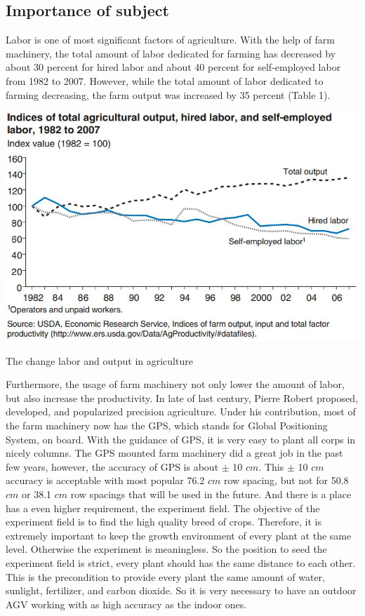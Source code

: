 \documentclass[12pt]{article}
\begin{document}
\begin{flushleft}
\subsection{Importance of subject}

Labor is one of most significant factors of agriculture. With the help of farm machinery, the total amount of labor dedicated for farming has decreased by about 30 percent for hired labor and about 40 percent for self-employed labor from 1982 to 2007. However, while the total amount of labor dedicated to farming decreasing, the farm output was increased by 35 percent (Table 1). \cite{o2011changing} %
\begin{table}[ht!]
	\begin{center}
		\includegraphics[scale = 0.7]{laborandoutput.jpg}
		\caption{The change labor and output in agriculture}
	\end{center}
\end{table}
Furthermore, the usage of farm machinery not only lower the amount of labor, but also increase the productivity. In late of last century, Pierre Robert proposed, developed, and popularized precision agriculture. \cite{mcbratney2005future} Under his contribution, most of the farm machinery now has the GPS, which stands for Global Positioning System, on board. With the guidance of GPS, it is very easy to plant all corps in nicely columns.  The GPS mounted farm machinery did a great job in the past few years, however, the accuracy of GPS is about $\pm$ 10 $cm$. \cite{thuilot2002automatic} This $\pm$ 10 $cm$ accuracy is acceptable with most popular 76.2 $cm$ row spacing, but not for 50.8 $cm$ or 38.1 $cm$ row spacings that will be used in the future. \cite{fawcett2014farm} And there is a place has a even higher requirement, the experiment field. The objective of the experiment field is to find the high quality breed of crops. Therefore, it is extremely important to keep the growth environment of every plant at the same level. Otherwise the experiment is meaningless. So the position to seed the experiment field is strict, every plant should has the same distance to each other. This is the precondition to provide every plant the same amount of water, sunlight, fertilizer, and carbon dioxide. So it is very necessary to have an outdoor AGV working with as high accuracy as the indoor ones.



\end{flushleft}
\end{document}
